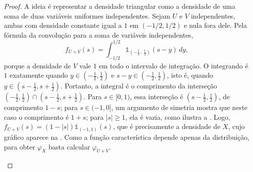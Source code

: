 \documentclass[12pt,portuguese]{article}
\theoremstyle{definition}
\theoremstyle{plainexercise}
\theoremstyle{starredexercise}
\theoremstyle{definition}
\begin{document}
\begin{proof}
A ideia é representar a densidade triangular como a densidade de uma soma de
duas variáveis uniformes independentes. Sejam $U$ e $V$ independentes, ambas
com densidade constante igual a $1$ em $(-1/2,1/2)$ e nula fora dele. Pela
fórmula da convolução para a soma de variáveis independentes,
\[
f_{U+V}(s)=\displaystyle\int_{-1/2}^{1/2}\mathds{1}_{\left(-\tfrac{1}{2}\, ,\, \tfrac{1}{2}\right)}(s-y)\,dy,
\]
porque a densidade de $V$ vale $1$ em todo o intervalo de integração. 
O integrando é $1$ exatamente quando 
$y\in(-\tfrac{1}{2},\tfrac{1}{2})$ e $s-y\in(-\tfrac{1}{2},\tfrac{1}{2})$, isto
é, quando $y\in(s-\tfrac{1}{2},s+\tfrac{1}{2})$. Portanto, a integral é o comprimento da
interseção $(-\tfrac{1}{2},\tfrac{1}{2})\cap(s-\tfrac{1}{2},s+\tfrac{1}{2})$. Para $s\in[0,1)$, essa interseção é
$(s-\tfrac{1}{2},\tfrac{1}{2})$, de comprimento $1-s$; para $s\in(-1,0]$, um argumento de simetria mostra que
neste caso o comprimento é $1+s$; para $|s|\geqslant1$, ela é vazia, como ilustra a
. Logo,
$f_{U+V}(s)=(1-|s|)\mathds{1}_{(-1,1)}(s)$, que é precisamente a densidade de
$X$, cujo gráfico aparece na .
Como a função característica depende apenas da distribuição, para obter
$\varphi_X$ basta calcular $\varphi_{U+V}$.

\begin{figure}[H]
\centering
{}
\end{figure}
\end{proof}
\end{document}
